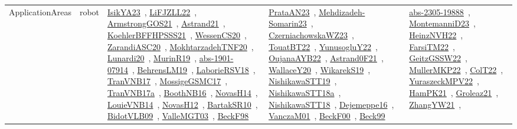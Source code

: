 {\begin{longtable}{lp{3cm}>{\raggedright\arraybackslash}p{6cm}>{\raggedright\arraybackslash}p{6cm}>{\raggedright\arraybackslash}p{8cm}}
ApplicationAreas & robot & \href{works/IsikYA23.pdf}{IsikYA23}~\cite{IsikYA23}, \href{works/LiFJZLL22.pdf}{LiFJZLL22}~\cite{LiFJZLL22}, \href{works/ArmstrongGOS21.pdf}{ArmstrongGOS21}~\cite{ArmstrongGOS21}, \href{works/Astrand21.pdf}{Astrand21}~\cite{Astrand21}, \href{works/KoehlerBFFHPSSS21.pdf}{KoehlerBFFHPSSS21}~\cite{KoehlerBFFHPSSS21}, \href{works/WessenCS20.pdf}{WessenCS20}~\cite{WessenCS20}, \href{works/ZarandiASC20.pdf}{ZarandiASC20}~\cite{ZarandiASC20}, \href{works/MokhtarzadehTNF20.pdf}{MokhtarzadehTNF20}~\cite{MokhtarzadehTNF20}, \href{works/Lunardi20.pdf}{Lunardi20}~\cite{Lunardi20}, \href{works/MurinR19.pdf}{MurinR19}~\cite{MurinR19}, \href{works/abs-1901-07914.pdf}{abs-1901-07914}~\cite{abs-1901-07914}, \href{works/BehrensLM19.pdf}{BehrensLM19}~\cite{BehrensLM19}, \href{works/LaborieRSV18.pdf}{LaborieRSV18}~\cite{LaborieRSV18}, \href{works/TranVNB17.pdf}{TranVNB17}~\cite{TranVNB17}, \href{works/MossigeGSMC17.pdf}{MossigeGSMC17}~\cite{MossigeGSMC17}, \href{works/TranVNB17a.pdf}{TranVNB17a}~\cite{TranVNB17a}, \href{works/BoothNB16.pdf}{BoothNB16}~\cite{BoothNB16}, \href{works/NovasH14.pdf}{NovasH14}~\cite{NovasH14}, \href{works/LouieVNB14.pdf}{LouieVNB14}~\cite{LouieVNB14}, \href{works/NovasH12.pdf}{NovasH12}~\cite{NovasH12}, \href{works/BartakSR10.pdf}{BartakSR10}~\cite{BartakSR10}, \href{works/BidotVLB09.pdf}{BidotVLB09}~\cite{BidotVLB09}, \href{works/ValleMGT03.pdf}{ValleMGT03}~\cite{ValleMGT03}, \href{works/BeckF98.pdf}{BeckF98}~\cite{BeckF98} & \href{works/PrataAN23.pdf}{PrataAN23}~\cite{PrataAN23}, \href{works/Mehdizadeh-Somarin23.pdf}{Mehdizadeh-Somarin23}~\cite{Mehdizadeh-Somarin23}, \href{works/CzerniachowskaWZ23.pdf}{CzerniachowskaWZ23}~\cite{CzerniachowskaWZ23}, \href{works/TouatBT22.pdf}{TouatBT22}~\cite{TouatBT22}, \href{works/YunusogluY22.pdf}{YunusogluY22}~\cite{YunusogluY22}, \href{works/OujanaAYB22.pdf}{OujanaAYB22}~\cite{OujanaAYB22}, \href{works/Astrand0F21.pdf}{Astrand0F21}~\cite{Astrand0F21}, \href{works/WallaceY20.pdf}{WallaceY20}~\cite{WallaceY20}, \href{works/WikarekS19.pdf}{WikarekS19}~\cite{WikarekS19}, \href{works/NishikawaSTT19.pdf}{NishikawaSTT19}~\cite{NishikawaSTT19}, \href{works/NishikawaSTT18a.pdf}{NishikawaSTT18a}~\cite{NishikawaSTT18a}, \href{works/NishikawaSTT18.pdf}{NishikawaSTT18}~\cite{NishikawaSTT18}, \href{works/Dejemeppe16.pdf}{Dejemeppe16}~\cite{Dejemeppe16}, \href{works/VanczaM01.pdf}{VanczaM01}~\cite{VanczaM01}, \href{works/BeckF00.pdf}{BeckF00}~\cite{BeckF00}, \href{works/Beck99.pdf}{Beck99}~\cite{Beck99} & \href{works/abs-2305-19888.pdf}{abs-2305-19888}~\cite{abs-2305-19888}, \href{works/MontemanniD23.pdf}{MontemanniD23}~\cite{MontemanniD23}, \href{works/HeinzNVH22.pdf}{HeinzNVH22}~\cite{HeinzNVH22}, \href{works/FarsiTM22.pdf}{FarsiTM22}~\cite{FarsiTM22}, \href{works/GeitzGSSW22.pdf}{GeitzGSSW22}~\cite{GeitzGSSW22}, \href{works/MullerMKP22.pdf}{MullerMKP22}~\cite{MullerMKP22}, \href{works/ColT22.pdf}{ColT22}~\cite{ColT22}, \href{works/YuraszeckMPV22.pdf}{YuraszeckMPV22}~\cite{YuraszeckMPV22}, \href{works/HamPK21.pdf}{HamPK21}~\cite{HamPK21}, \href{works/Groleaz21.pdf}{Groleaz21}~\cite{Groleaz21}, \href{works/ZhangYW21.pdf}{ZhangYW21}~\cite{ZhangYW21}, 
\end{longtable}}
